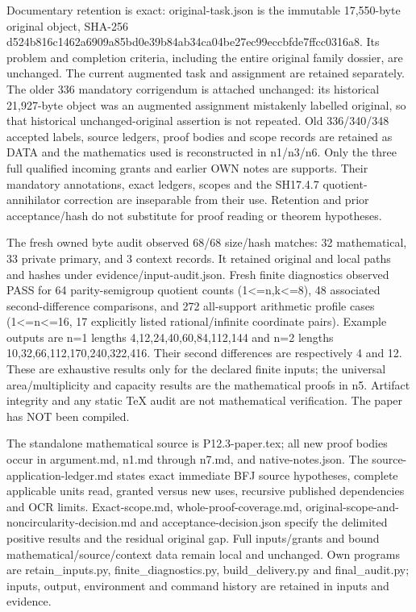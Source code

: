 \documentclass[11pt]{article}
\begin{document}
Documentary retention is exact: original-task.json is the immutable 17,550-byte original object, SHA-256 d524b816c1462a6909a85bd0e39b84ab34ca04be27ec99eccbfde7ffcc0316a8. Its problem and completion criteria, including the entire original family dossier, are unchanged. The current augmented task and assignment are retained separately. The older 336 mandatory corrigendum is attached unchanged: its historical 21,927-byte object was an augmented assignment mistakenly labelled original, so that historical unchanged-original assertion is not repeated. Old 336/340/348 accepted labels, source ledgers, proof bodies and scope records are retained as DATA and the mathematics used is reconstructed in n1/n3/n6. Only the three full qualified incoming grants and earlier OWN notes are supports. Their mandatory annotations, exact ledgers, scopes and the SH17.4.7 quotient-annihilator correction are inseparable from their use. Retention and prior acceptance/hash do not substitute for proof reading or theorem hypotheses.

The fresh owned byte audit observed 68/68 size/hash matches: 32 mathematical, 33 private primary, and 3 context records. It retained original and local paths and hashes under evidence/input-audit.json. Fresh finite diagnostics observed PASS for 64 parity-semigroup quotient counts (1<=n,k<=8), 48 associated second-difference comparisons, and 272 all-support arithmetic profile cases (1<=n<=16, 17 explicitly listed rational/infinite coordinate pairs). Example outputs are n=1 lengths 4,12,24,40,60,84,112,144 and n=2 lengths 10,32,66,112,170,240,322,416. Their second differences are respectively 4 and 12. These are exhaustive results only for the declared finite inputs; the universal area/multiplicity and capacity results are the mathematical proofs in n5. Artifact integrity and any static TeX audit are not mathematical verification. The paper has NOT been compiled.

The standalone mathematical source is P12.3-paper.tex; all new proof bodies occur in argument.md, n1.md through n7.md, and native-notes.json. The source-application-ledger.md states exact immediate BFJ source hypotheses, complete applicable units read, granted versus new uses, recursive published dependencies and OCR limits. Exact-scope.md, whole-proof-coverage.md, original-scope-and-noncircularity-decision.md and acceptance-decision.json specify the delimited positive results and the residual original gap. Full inputs/grants and bound mathematical/source/context data remain local and unchanged. Own programs are retain\_inputs.py, finite\_diagnostics.py, build\_delivery.py and final\_audit.py; inputs, output, environment and command history are retained in inputs and evidence.
\end{document}
